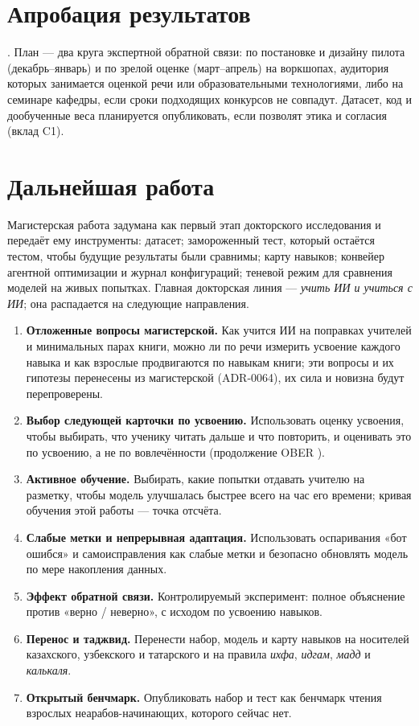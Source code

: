 \section{Апробация результатов}\label{sec:concl-dissemination}

. План --- два круга экспертной обратной связи: по постановке и
дизайну пилота (декабрь--январь) и по зрелой оценке (март--апрель) на воркшопах, аудитория которых занимается
оценкой речи или образовательными технологиями, либо на семинаре кафедры, если сроки подходящих конкурсов не
совпадут. Датасет, код и дообученные веса планируется опубликовать, если позволят этика и согласия
(вклад C1).

\section{Дальнейшая работа}

Магистерская работа задумана как первый этап докторского исследования и передаёт ему инструменты: датасет;
замороженный тест, который остаётся тестом, чтобы будущие результаты были сравнимы; карту навыков; конвейер агентной оптимизации и журнал конфигураций; теневой режим для сравнения моделей на живых попытках.
Главная докторская линия --- \emph{учить ИИ и учиться с ИИ}; она распадается на следующие направления.
\begin{enumerate}
  \item \textbf{Отложенные вопросы магистерской.} Как учится ИИ на поправках учителей и минимальных парах книги,
    можно ли по речи измерить усвоение каждого навыка и как взрослые продвигаются по навыкам книги; эти
    вопросы и их гипотезы перенесены из магистерской (ADR-0064), их сила и новизна будут перепроверены.
  \item \textbf{Выбор следующей карточки по усвоению.} Использовать оценку усвоения, чтобы выбирать, что ученику
    читать дальше и что повторить, и оценивать это по усвоению, а не по вовлечённости (продолжение OBER
    \cite{SRC-134}).
  \item \textbf{Активное обучение.} Выбирать, какие попытки отдавать учителю на разметку, чтобы модель
    улучшалась быстрее всего на час его времени; кривая обучения этой работы --- точка отсчёта.
  \item \textbf{Слабые метки и непрерывная адаптация.} Использовать оспаривания «бот ошибся» и самоисправления
    как слабые метки и безопасно обновлять модель по мере накопления данных.
  \item \textbf{Эффект обратной связи.} Контролируемый эксперимент: полное объяснение против «верно / неверно»,
    с исходом по усвоению навыков.
  \item \textbf{Перенос и таджвид.} Перенести набор, модель и карту навыков на носителей казахского, узбекского и
    татарского и на правила \emph{ихфа}, \emph{идгам}, \emph{мадд} и \emph{калькаля}.
  \item \textbf{Открытый бенчмарк.} Опубликовать набор и тест как бенчмарк чтения взрослых неарабов-начинающих,
    которого сейчас нет.
\end{enumerate}

